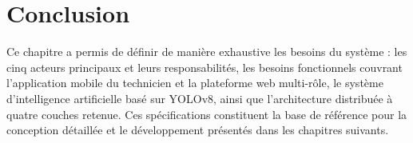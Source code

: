 \section*{Conclusion}

Ce chapitre a permis de définir de manière exhaustive les besoins du système : les cinq acteurs principaux et leurs responsabilités, les besoins fonctionnels couvrant l'application mobile du technicien et la plateforme web multi-rôle, le système d'intelligence artificielle basé sur YOLOv8, ainsi que l'architecture distribuée à quatre couches retenue. Ces spécifications constituent la base de référence pour la conception détaillée et le développement présentés dans les chapitres suivants.
